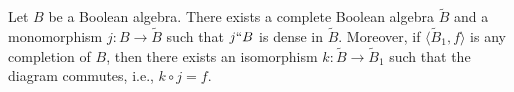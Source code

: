 Let $B$ be a Boolean algebra. There exists a complete Boolean algebra $\tilde{B}$ and a monomorphism $j: B \rightarrow \tilde{B}$ such that $j``B$ is dense in $\tilde{B}$. Moreover, if $\langle \tilde{B}_1, f \rangle$ is any completion of $B$, then there exists an isomorphism $k: \tilde{B} \rightarrow \tilde{B}_1$ such that the diagram commutes, i.e., $k \circ j = f$.
